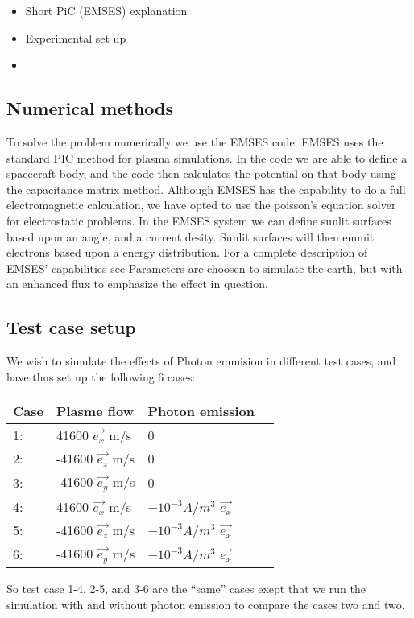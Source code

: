 \begin{itemize}
	\item Short PiC (EMSES) explanation
	\item Experimental set up
	\item 
\end{itemize}
\subsection{Numerical methods}

To solve the problem numerically we use the EMSES code. EMSES uses the standard PIC method for plasma simulations.
In the code we are able to define a spacecraft body, and the code then calculates the potential on that body using the capacitance matrix method.
Although EMSES has the capability to do a full electromagnetic calculation, we have opted to use the poisson's equation 
solver for electrostatic problems. In the EMSES system we can define sunlit surfaces based upon an angle, and a current 
desity. Sunlit surfaces will then emmit electrons based upon a energy distribution. For a complete description of EMSES' capabilities
see \citep{nakashima_ohhelp:_2009} Parameters are choosen to simulate the earth, but with an enhanced flux to emphasize the effect in question. 


\subsection{Test case setup}

We wish to simulate the effects of Photon emmision in different test cases, and have thus set up the following
6 cases:
\begin{center}
    \begin{tabular}{ | l | l | l | p{5cm} |}
    \hline
    Case & Plasme flow & Photon emission  \\ \hline
     1: & 41600 $\vec{e_x}$ m/s  & 0 \\ \hline
     2: & -41600 $\vec{e_z}$ m/s & 0 \\ \hline
     3: & -41600 $\vec{e_y}$ m/s & 0 \\ \hline
     4: & 41600 $\vec{e_x}$ m/s & $-10^{-3} A/m^{3}$ $\vec{e_x}$\\ \hline
     5: & -41600 $\vec{e_z}$ m/s & $-10^{-3} A/m^{3}$ $\vec{e_x}$\\ \hline
     6: & -41600 $\vec{e_y}$ m/s & $-10^{-3} A/m^{3}$  $\vec{e_x}$\\
    \hline
    \end{tabular}
\end{center}

So test case 1-4, 2-5, and 3-6 are the ``same'' cases exept that we run the simulation with and without
photon emission to compare the cases two and two. 